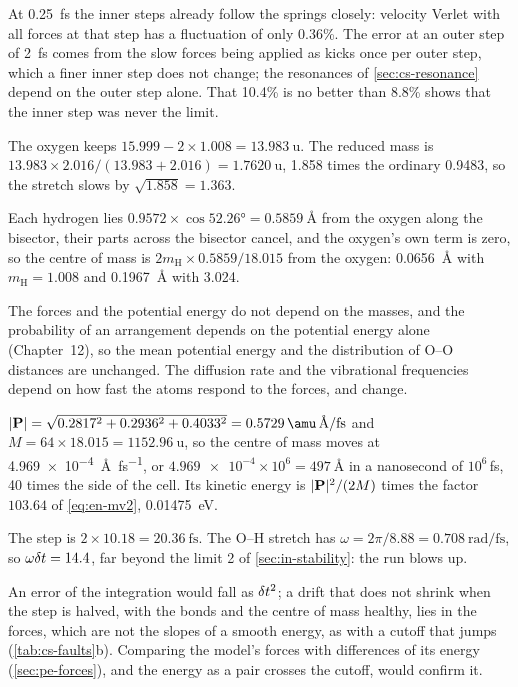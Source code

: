 At \SI{0.25}{\femto\second} the inner steps
already follow the springs closely: velocity Verlet with all forces at
that step has a fluctuation of only 0.36\%. The error at an outer step of
\SI{2}{\femto\second} comes from the slow forces being applied as kicks
once per outer step, which a finer inner step does not change; the
resonances of \cref{sec:cs-resonance} depend on the outer step alone.
That 10.4\% is no better than 8.8\% shows that the inner step was never
the limit.

The oxygen keeps $15.999 - 2\times1.008 =
\SI{13.983}{\amu}$. The reduced mass is $13.983\times2.016/(13.983 +
2.016) = \SI{1.7620}{\amu}$, 1.858 times the ordinary 0.9483, so the
stretch slows by $\sqrt{1.858} = 1.363$.

Each hydrogen lies
$0.9572\times\cos\ang{52.26} = \SI{0.5859}{\angstrom}$ from the oxygen
along the bisector, their parts across the bisector cancel, and the
oxygen's own term is zero, so the centre of
mass is $2m_{\mathrm H}\times0.5859/18.015$ from the oxygen: \SI{0.0656}{\angstrom} with $m_{\mathrm H} = 1.008$ and
\SI{0.1967}{\angstrom} with 3.024.

The forces and the potential energy do not
depend on the masses, and the probability of an arrangement depends on
the potential energy alone (Chapter~12), so the mean potential energy and
the distribution of O--O distances are unchanged. The diffusion rate and
the vibrational frequencies depend on how fast the atoms respond to the
forces, and change.

$\lvert\vb{P}\rvert = \sqrt{0.2817^2 + 0.2936^2
+ 0.4033^2} = \SI{0.5729}{\amu\,\angstrom\per\femto\second}$ and $M =
64\times18.015 = \SI{1152.96}{\amu}$, so the centre of mass moves at
\SI{4.969e-4}{\angstrom\per\femto\second}, or $\num{4.969e-4}\times10^6
= \SI{497}{\angstrom}$ in a nanosecond of $10^6$\,fs, 40 times the side
of the cell. Its kinetic energy is $\lvert\bm{\mathrm{P}}\rvert^2/(2M)$ times the
factor $\num{103.64}$ of \cref{eq:en-mv2},
\SI{0.01475}{\electronvolt}.

The step is $2\times10.18 =
\SI{20.36}{\femto\second}$. The O--H stretch has $\omega = 2\pi/8.88 =
\SI{0.708}{\radian\per\femto\second}$, so $\omega\delta t = 14.4$, far beyond
the limit 2 of \cref{sec:in-stability}: the run blows up.

An error of the integration would fall as
$\delta t^2$; a drift that does not shrink when the step is halved, with the
bonds and the centre of mass healthy, lies in the forces,
which are not the slopes of a smooth energy, as with a cutoff that jumps
(\cref{tab:cs-faults}b). Comparing the model's forces with differences of
its energy (\cref{sec:pe-forces}), and the energy as a pair crosses the
cutoff, would confirm it.
